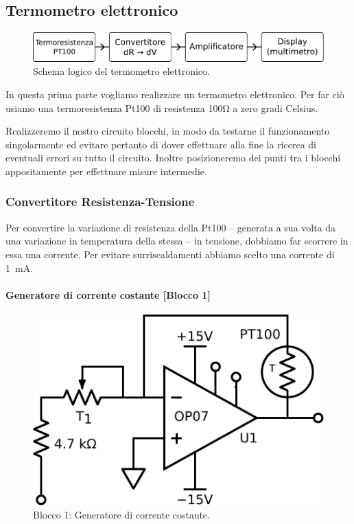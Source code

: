 \subsection{Termometro elettronico}

\begin{figure}
\centering
\includegraphics[width=.6\textwidth]{../E06/latex/s1.pdf}
\caption{Schema logico del termometro elettronico.}
\label{fig6:scheme1}
\end{figure}

In questa prima parte vogliamo realizzare un termometro elettronico.
Per far ciò usiamo una termoresistenza Pt100 di resistenza 100\si{\ohm} a zero gradi Celsius.

Realizzeremo il nostro circuito blocchi, in modo da testarne il funzionamento singolarmente ed evitare pertanto di dover effettuare alla fine la ricerca di eventuali errori su tutto il circuito.
Inoltre posizioneremo dei punti tra i blocchi appositamente per effettuare misure intermedie.

\subsubsection{Convertitore Resistenza-Tensione}
Per convertire la variazione di resistenza della Pt100 -- generata a sua volta da una variazione in temperatura della stessa -- in tensione, dobbiamo far scorrere in essa una corrente.
Per evitare surriscaldamenti abbiamo scelto una corrente di \SI{1}{\milli\ampere}.
%
\paragraph{Generatore di corrente costante [Blocco 1]\newline}

\begin{figure}
\centering
\includegraphics[width=.3\textwidth]{../E06/latex/P1.pdf}
\caption{Blocco 1: Generatore di corrente costante.}
\label{cir6:2wire}
\end{figure}

